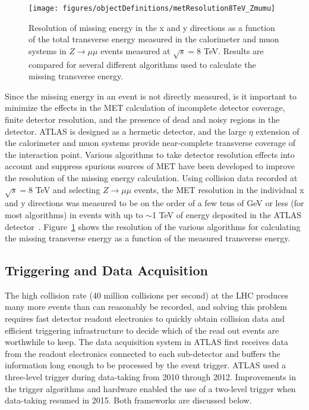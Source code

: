 \begin{figure}[h!]
\centering
\label{fig:metResolution_8TeV}
\texttt{[image: figures/objectDefinitions/metResolution8TeV\_Zmumu]}
\caption{Resolution of missing energy in the x and y directions as a function of the total transverse energy measured in the calorimeter and muon systems in $Z\rightarrow\mu\mu$ events measured at $\sqrt{s}=8$ TeV. Results are compared for several different algorithms used to calculate the missing transverse energy.}
\end{figure}

Since the missing energy in an event is not directly measured, is it important to minimize the effects in the MET calculation of incomplete detector coverage, finite detector resolution, and the presence of dead and noisy regions in the detector. ATLAS is designed as a hermetic detector, and the large $\eta$ extension of the calorimeter and muon systems provide near-complete transverse coverage of the interaction point. Various algorithms to take detector resolution effects into account and suppress spurious sources of MET have been developed to improve the resolution of the missing energy calculation. Using collision data recorded at $\sqrt{s}=8$ TeV and selecting $Z\rightarrow\mu\mu$ events, the MET resolution in the individual x and y directions was measured to be on the order of a few tens of GeV or less (for most \met algorithms) in events with up to $\sim$1 TeV of energy deposited in the ATLAS detector~\cite{ATLAS-CONF-2013-082}. Figure~\ref{fig:metResolution_8TeV} shows the resolution of the various algorithms for calculating the missing transverse energy as a function of the measured transverse energy.

\subsection{Triggering and Data Acquisition}
The high collision rate (40 million collisions per second) at the LHC produces many more events than can reasonably be recorded, and solving this problem requires fast detector readout electronics to quickly obtain collision data and efficient triggering infrastructure to decide which of the read out events are worthwhile to keep. The data acquisition system in ATLAS first receives data from the readout electronics connected to each sub-detector and buffers the information long enough to be processed by the event trigger. ATLAS used a three-level trigger during data-taking from 2010 through 2012. Improvements in the trigger algorithms and hardware enabled the use of a two-level trigger when data-taking resumed in 2015. Both frameworks are discussed below.

